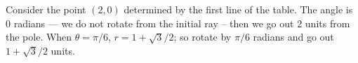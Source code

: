 \begin{example}
Consider the point $(2,0)$ determined by the first line of the table. The angle is 0 radians --- we do not rotate from the initial ray -- then we go out 2 units from the pole. When $\theta=\pi/6$, $r = 1+\sqrt{3}/2$; so rotate by $\pi/6$ radians and go out $1+\sqrt{3}/2$ units.
\end{example}

%

